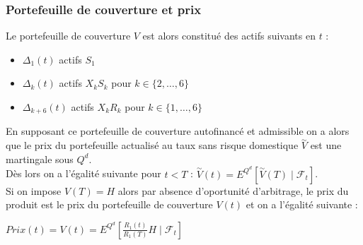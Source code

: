 \documentclass[a4paper,12pt]{article}
\begin{document}
\subsubsection{Portefeuille de couverture et prix}
Le portefeuille de couverture $V$ est alors constitué des actifs suivants en $t$ : 
\begin{itemize}[label=$\bullet$]
\item $\Delta_1(t)$ actifs $S_1$
\item $\Delta_k(t)$ actifs $X_kS_k$ pour $k\in\{2,\ldots,6\}$
\item $\Delta_{k+6}(t)$ actifs $X_kR_k$ pour $k\in\{1,\ldots,6\}$
\end{itemize}
En supposant ce portefeuille de couverture autofinancé et admissible on a alors que le prix du portefeuille actualisé au taux sans risque domestique $\overset{\sim}{V}$ est une martingale sous $Q^d$. \\[1mm]
Dès lors on a l'égalité suivante pour $t<T$ : $\overset{\sim}{V}(t) = E^{Q^d}\left[\overset{\sim}{V}(T)\mid\mathcal{F}_t\right]$. \\[2mm]
Si on impose $V(T)=H$ alors par absence d'oportunité d'arbitrage, le prix du produit est le prix du portefeuille de couverture $V(t)$ et on a l'égalité suivante : \begin{center}
$Prix(t) = V(t) = E^{Q^d}\left[\frac{R_1(t)}{R_1(T)}H\mid\mathcal{F}_t\right]$
\end{center}
\end{document}
